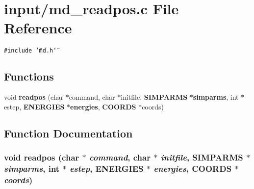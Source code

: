 \section{input/md\_\-readpos.c File Reference}
\label{md__readpos_8c}
{\tt \#include \char`\"{}md.h\char`\"{}}\par
\subsection*{Functions}
\begin{CompactItemize}
\item 
void {\bf readpos} (char $\ast$command, char $\ast$initfile, {\bf SIMPARMS} $\ast${\bf simparms}, int $\ast$estep, {\bf ENERGIES} $\ast${\bf energies}, {\bf COORDS} $\ast$coords)
\end{CompactItemize}


\subsection{Function Documentation}
\subsubsection{\setlength{\rightskip}{0pt plus 5cm}void readpos (char $\ast$ {\em command}, char $\ast$ {\em initfile}, {\bf SIMPARMS} $\ast$ {\em simparms}, int $\ast$ {\em estep}, {\bf ENERGIES} $\ast$ {\em energies}, {\bf COORDS} $\ast$ {\em coords})}\label{md__readpos_8c_afcc7b2f64187d1467219aafd655b801}


